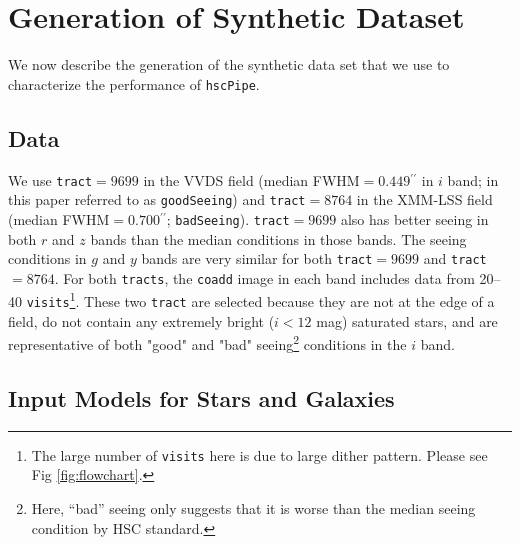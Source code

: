 \documentclass[useamsfonts]{pasj01}
\def\asec{$^{\prime\prime}$}
\def\hscpipe{\texttt{hscPipe}}
\def\coadd{\texttt{coadd}}
\def\tract{\texttt{tract}}
\def\tracts{\texttt{tracts}}
\def\visits{\texttt{visits}}
\begin{document}
\section{Generation of Synthetic Dataset}
    \label{sec:test}
    
    We now describe the generation of the synthetic data set that we use to 
    characterize the performance of \hscpipe{}.

\subsection{Data}
    We use \tract{}$=9699$ in the VVDS field (median FWHM$=0.449$\asec{} in $i$ band;
    in this paper referred to as \texttt{goodSeeing}) and
    \tract{}$=8764$ in the XMM-LSS field (median FWHM$=0.700$\asec{};
    \texttt{badSeeing}).
    \tract{}$=9699$ also has better seeing in both $r$ and $z$ bands than the median 
    conditions in those bands.
    The seeing conditions in $g$ and $y$ bands are very similar for both
    \tract{}$=9699$ and \tract{}$=8764$.
    For both \tracts{}, the \coadd{} image in each band includes data from
    20--40 \visits{}\footnote{The large number of \visits{} here is due to large 
    dither pattern. Please see Fig \ref{fig:flowchart}.}.  
    These two \tract{} are selected because they are not at the edge of a field, do 
    not contain any extremely bright ($i<12$ mag) saturated stars, and are 
    representative of both "good" and "bad" seeing\footnote{Here, ``bad'' seeing only 
    suggests that it is worse than the median seeing condition by HSC standard.} 
    conditions in the $i$ band.

\subsection{Input Models for Stars and Galaxies}
    \label{ssec:inputs}
\end{document}
